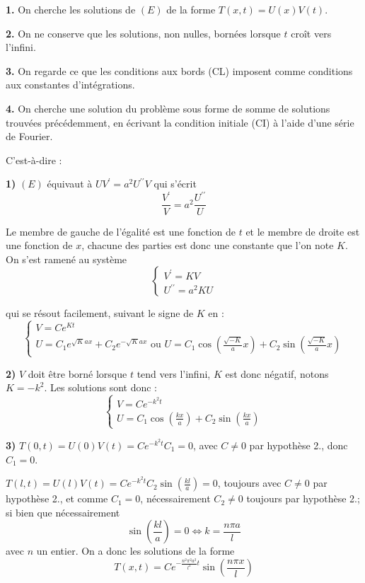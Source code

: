 \documentclass[12pt]{article}
\begin{document}
\begin{corrige}
\textbf{1.} On cherche les solutions de $(E)$ de la forme $T(x, t) = U(x) V(t)$.

\textbf{2.} On ne conserve que les solutions, non nulles, bornées lorsque $t$ croît vers l'infini.

\textbf{3.} On regarde ce que les conditions aux bords (CL) imposent comme conditions aux constantes d'intégrations.

\textbf{4.} On cherche une solution du problème sous forme de somme de solutions trouvées précédemment, en écrivant la condition initiale (CI) à l'aide d'une série de Fourier.

C'est-à-dire :

\textbf{1)} $(E)$ équivaut à $U V^{\prime} = a^{2} U^{\prime \prime} V$ qui s'écrit
$$
\frac{V^{\prime}}{V} = a^{2} \frac{U^{\prime \prime}}{U}
$$

Le membre de gauche de l'égalité est une fonction de $t$ et le membre de droite est une fonction de $x$, chacune des parties est donc une constante que l'on note $K$. On s'est ramené au système
$$
\left\{\begin{array}{l}
V^{\prime} = K V \\
U^{\prime \prime} = a^{2} K U
\end{array}\right.
$$

qui se résout facilement, suivant le signe de $K$ en :
$$
\left\{\begin{array}{l}
V = C e^{Kt} \\
U = C_{1} e^{\sqrt{K} ax} + C_{2} e^{-\sqrt{K} ax} \text{ ou } U = C_{1} \cos\left(\frac{\sqrt{-K}}{a} x\right) + C_{2} \sin\left(\frac{\sqrt{-K}}{a} x\right)
\end{array}\right.
$$

\textbf{2)} $V$ doit être borné lorsque $t$ tend vers l'infini, $K$ est donc négatif, notons $K = -k^{2}$. Les solutions sont donc :
$$
\left\{\begin{array}{l}
V = C e^{-k^{2} t} \\
U = C_{1} \cos\left(\frac{kx}{a}\right) + C_{2} \sin\left(\frac{kx}{a}\right)
\end{array}\right.
$$

\textbf{3)} $T(0, t) = U(0) V(t) = C e^{-k^{2} t} C_{1} = 0$, avec $C \neq 0$ par hypothèse 2., donc $C_{1} = 0$. 

$T(l, t) = U(l) V(t) = C e^{-k^{2} t} C_{2} \sin\left(\frac{kl}{a}\right) = 0$, toujours avec $C \neq 0$ par hypothèse 2., et comme $C_{1} = 0$, nécessairement $C_{2} \neq 0$ toujours par hypothèse 2.; si bien que nécessairement
$$
\sin\left(\frac{kl}{a}\right) = 0 \Longleftrightarrow k = \frac{n \pi a}{l}
$$
avec $n$ un entier. On a donc les solutions de la forme
$$
T(x, t) = C e^{-\frac{n^{2} \pi^{2} a^{2}}{l^{2}} t} \sin\left(\frac{n \pi x}{l}\right)
$$


\end{corrige}
\end{document}
